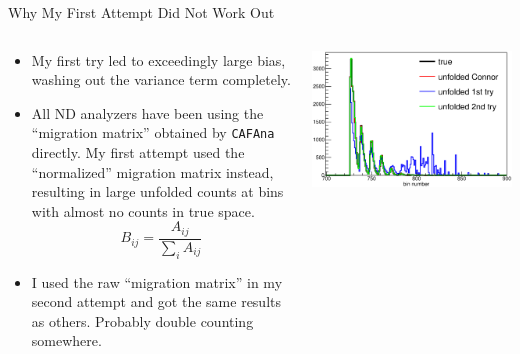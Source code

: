 \documentclass[aspectratio=169]{beamer}
\begin{document}
\begin{frame}{Why My First Attempt Did Not Work Out}
  \begin{columns}
    \begin{column}{.5\textwidth}
    \begin{itemize}
      \footnotesize
      \item My first try led to exceedingly large bias, washing out the variance term completely.
      \item All ND analyzers have been using the ``migration matrix'' obtained by \texttt{CAFAna} directly. My first attempt used the ``normalized'' migration matrix instead, resulting in large unfolded counts at bins with almost no counts in true space.
        \begin{equation*}
          B_{ij}=\frac{A_{ij}}{\sum_i A_{ij}}
        \end{equation*}
      \item I used the raw ``migration matrix'' in my second attempt and got the same results as others. Probably double counting somewhere.
    \end{itemize}
    \end{column}
    \begin{column}{.5\textwidth}
      \includegraphics[width=\textwidth]{figures/unfolded_old_new_comparison.eps}
    \end{column}
  \end{columns}
\end{frame}
\end{document}

